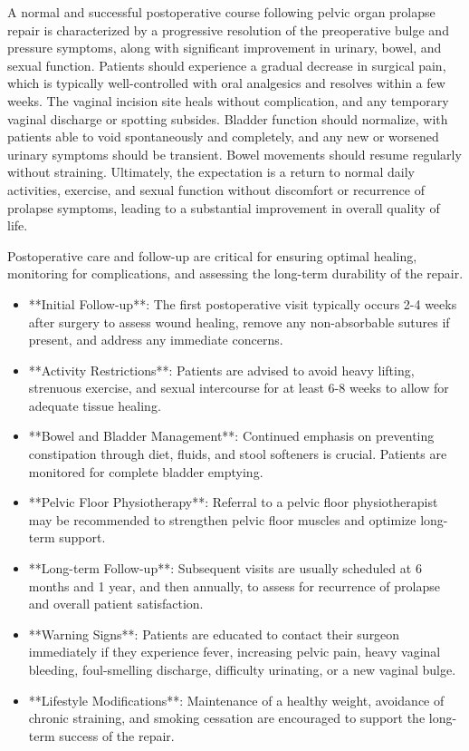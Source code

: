 A normal and successful postoperative course following pelvic organ prolapse repair is characterized by a progressive resolution of the preoperative bulge and pressure symptoms, along with significant improvement in urinary, bowel, and sexual function. Patients should experience a gradual decrease in surgical pain, which is typically well-controlled with oral analgesics and resolves within a few weeks. The vaginal incision site heals without complication, and any temporary vaginal discharge or spotting subsides. Bladder function should normalize, with patients able to void spontaneously and completely, and any new or worsened urinary symptoms should be transient. Bowel movements should resume regularly without straining. Ultimately, the expectation is a return to normal daily activities, exercise, and sexual function without discomfort or recurrence of prolapse symptoms, leading to a substantial improvement in overall quality of life.

Postoperative care and follow-up are critical for ensuring optimal healing, monitoring for complications, and assessing the long-term durability of the repair.

\begin{itemize}
  \item **Initial Follow-up**: The first postoperative visit typically occurs 2-4 weeks after surgery to assess wound healing, remove any non-absorbable sutures if present, and address any immediate concerns.
  
  \item **Activity Restrictions**: Patients are advised to avoid heavy lifting, strenuous exercise, and sexual intercourse for at least 6-8 weeks to allow for adequate tissue healing.
  
  \item **Bowel and Bladder Management**: Continued emphasis on preventing constipation through diet, fluids, and stool softeners is crucial. Patients are monitored for complete bladder emptying.
  
  \item **Pelvic Floor Physiotherapy**: Referral to a pelvic floor physiotherapist may be recommended to strengthen pelvic floor muscles and optimize long-term support.
  
  \item **Long-term Follow-up**: Subsequent visits are usually scheduled at 6 months and 1 year, and then annually, to assess for recurrence of prolapse and overall patient satisfaction.
  
  \item **Warning Signs**: Patients are educated to contact their surgeon immediately if they experience fever, increasing pelvic pain, heavy vaginal bleeding, foul-smelling discharge, difficulty urinating, or a new vaginal bulge.
  
  \item **Lifestyle Modifications**: Maintenance of a healthy weight, avoidance of chronic straining, and smoking cessation are encouraged to support the long-term success of the repair.
\end{itemize}

